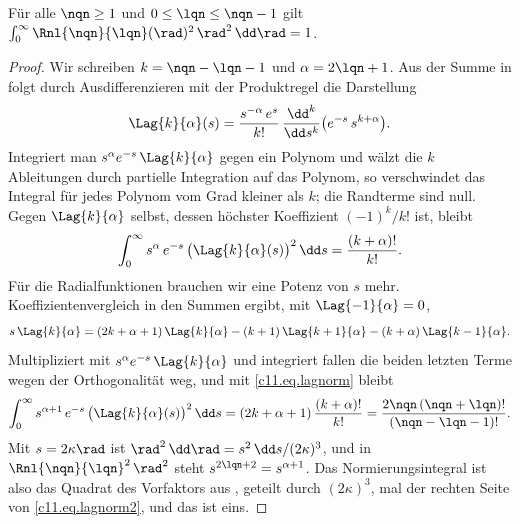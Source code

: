 \begin{vertiefung}
  \begin{proposition}\label{c11.prop.norm}
    Für alle $\nqn \geq 1$ und $0 \leq \lqn \leq \nqn - 1$ gilt
    $\int_0^\infty \Rnl{\nqn}{\lqn}(\rad)^2\,\rad^2\,\dd\rad = 1$.
  \end{proposition}
  \begin{proof}
    Wir schreiben $k = \nqn - \lqn - 1$ und $\alpha = 2\lqn + 1$. Aus der Summe in
     folgt durch Ausdifferenzieren mit der Produktregel die Darstellung
    \begin{equation}\label{c11.eq.rodrigues}
      \Lag{k}{\alpha}(s) = \frac{s^{-\alpha}\,e^{s}}{k!}\,
        \frac{\dd^k}{\dd s^k}\bigl(e^{-s}\,s^{k + \alpha}\bigr).
    \end{equation}
    Integriert man $s^\alpha e^{-s}\,\Lag{k}{\alpha}$ gegen ein Polynom und wälzt die
    $k$ Ableitungen durch partielle Integration auf das Polynom, so verschwindet das
    Integral für jedes Polynom vom Grad kleiner als $k$; die Randterme sind null. Gegen
    $\Lag{k}{\alpha}$ selbst, dessen höchster Koeffizient $(-1)^k/k!$ ist, bleibt
    \begin{equation}\label{c11.eq.lagnorm}
      \int_0^\infty s^{\alpha}\,e^{-s}\,\bigl(\Lag{k}{\alpha}(s)\bigr)^2\,\dd s
      = \frac{(k + \alpha)!}{k!} .
    \end{equation}
    Für die Radialfunktionen brauchen wir eine Potenz von $s$ mehr. Koeffizientenvergleich
    in den Summen ergibt, mit $\Lag{-1}{\alpha} = 0$,
    \begin{equation}\label{c11.eq.dreiterm}
      s\,\Lag{k}{\alpha} = (2k + \alpha + 1)\,\Lag{k}{\alpha}
        - (k + 1)\,\Lag{k + 1}{\alpha} - (k + \alpha)\,\Lag{k - 1}{\alpha} .
    \end{equation}
    Multipliziert mit $s^\alpha e^{-s}\,\Lag{k}{\alpha}$ und integriert fallen die beiden
    letzten Terme wegen der Orthogonalität weg, und mit \eqref{c11.eq.lagnorm} bleibt
    \begin{equation}\label{c11.eq.lagnorm2}
      \int_0^\infty s^{\alpha + 1}\,e^{-s}\,\bigl(\Lag{k}{\alpha}(s)\bigr)^2\,\dd s
      = (2k + \alpha + 1)\,\frac{(k + \alpha)!}{k!}
      = \frac{2\nqn\,(\nqn + \lqn)!}{(\nqn - \lqn - 1)!} .
    \end{equation}
    Mit $s = 2\kappa\rad$ ist $\rad^2\,\dd\rad = s^2\,\dd s/(2\kappa)^3$, und in
    $\Rnl{\nqn}{\lqn}^2\,\rad^2$ steht $s^{2\lqn + 2} = s^{\alpha + 1}$. Das
    Normierungsintegral ist also das Quadrat des Vorfaktors aus , geteilt
    durch $(2\kappa)^3$, mal der rechten Seite von \eqref{c11.eq.lagnorm2}, und das ist
    eins.
  \end{proof}
\end{vertiefung}

